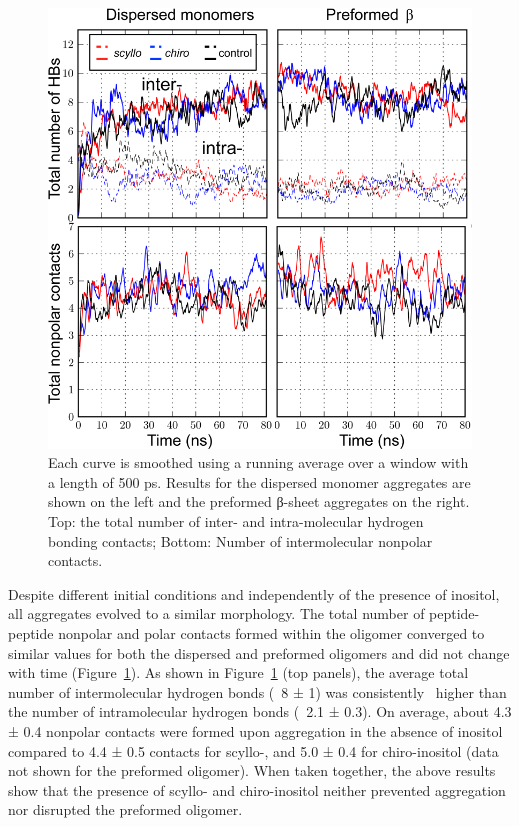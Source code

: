 \begin{figure}[htbp]
  \centering
  \includegraphics[width=4.5in]{figures/results1/GA4_paper_figures_submitted-5}
  \caption[Time evolution of peptide-peptide nonpolar and hydrogen bonding contacts in disordered aggregates in presence and absence of inositol (control).]{Each curve is smoothed using a running average over a window with a length of 500 ps. Results for the dispersed monomer aggregates are shown on the left and the preformed β-sheet aggregates on the right. Top: the total number of inter- and intra-molecular hydrogen bonding contacts; Bottom: Number of intermolecular nonpolar contacts.}
   \label{fig:figure5}
\end{figure}
  
Despite different initial conditions and independently of the presence of inositol, all aggregates evolved to a similar morphology. The total number of peptide-peptide nonpolar and polar contacts formed within the oligomer converged to similar values for both the dispersed and preformed oligomers and did not change with time (Figure~\ref{fig:figure5}). As shown in Figure~\ref{fig:figure5} (top panels), the average total number of intermolecular hydrogen bonds (~8 ± 1) was consistently \bbridge\ higher than the number of intramolecular hydrogen bonds (~2.1 ± 0.3). On average, about 4.3 ± 0.4 nonpolar contacts were formed upon aggregation in the absence of inositol compared to 4.4 ± 0.5 contacts for scyllo-, and 5.0 ± 0.4 for chiro-inositol (data not shown for the preformed oligomer). When taken together, the above results show that the presence of scyllo- and chiro-inositol neither prevented aggregation nor disrupted the preformed oligomer.

